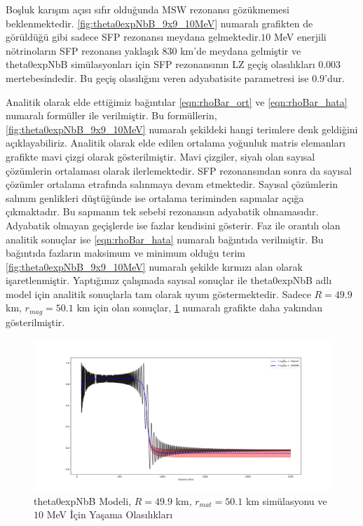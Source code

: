 Boşluk karışım açısı sıfır olduğunda MSW rezonansı gözükmemesi beklenmektedir. \ref{fig:theta0expNbB_9x9_10MeV} numaralı grafikten de görüldüğü gibi sadece SFP rezonansı meydana gelmektedir.$ 10 $ MeV enerjili nötrinoların SFP rezonansı yaklaşık $830$ km'de meydana gelmiştir ve theta0expNbB simülasyonları için SFP rezonansının LZ geçiş olasılıkları $ 0.003 $ mertebesindedir. Bu geçiş olasılığını veren adyabatisite parametresi ise $ 0.9 $'dur.

Analitik olarak elde ettiğimiz bağıntılar \eqref{eqn:rhoBar_ort} ve \eqref{eqn:rhoBar_hata} numaralı formüller ile verilmiştir. Bu formüllerin, \ref{fig:theta0expNbB_9x9_10MeV} numaralı şekildeki hangi terimlere denk geldiğini açıklayabiliriz. Analitik olarak elde edilen ortalama yoğunluk matris elemanları grafikte mavi çizgi olarak gösterilmiştir. Mavi çizgiler, siyah olan sayısal çözümlerin ortalaması olarak ilerlemektedir. SFP rezonansından sonra da sayısal çözümler ortalama etrafında salınmaya devam etmektedir. Sayısal çözümlerin salınım genlikleri düştüğünde ise ortalama teriminden sapmalar açığa çıkmaktadır. Bu sapmanın tek sebebi rezonansın adyabatik olmamasıdır. Adyabatik olmayan geçişlerde ise fazlar kendisini gösterir. Faz ile orantılı olan analitik sonuçlar ise \eqref{eqn:rhoBar_hata} numaralı bağıntıda verilmiştir. Bu bağıntıda fazların maksimum ve minimum olduğu terim \ref{fig:theta0expNbB_9x9_10MeV} numaralı şekilde kırmızı alan olarak işaretlenmiştir. Yaptığımız çalışmada sayısal sonuçlar ile theta0expNbB adlı model için analitik sonuçlarla tam olarak uyum göstermektedir. Sadece $ R=49.9 $ km, $ r_{mag}=50.1 $ km için olan sonuçlar, \ref{fig:theta0expNbB__R49_9_rmag50_1_10MeV} numaralı grafikte daha yakından gösterilmiştir.

\begin{figure}[hbt!]
    \centering
    \includegraphics[width=1\textwidth]{figures/theta0expNbB_R49_9_rmag50_1_10MeV.pdf}
    \caption[theta0expNbB Modeli, $ R=49.9 $ km, $ r_{mat}=50.1 $ km simülasyonu ve $ 10 $ MeV İçin Uzaklığa Karşılık Yaşama Olasılıkları]{theta0expNbB Modeli, $ R=49.9 $ km, $ r_{mat}=50.1 $ km simülasyonu ve $ 10 $ MeV İçin Yaşama Olasılıkları}
    \label{fig:theta0expNbB__R49_9_rmag50_1_10MeV}
\end{figure}

